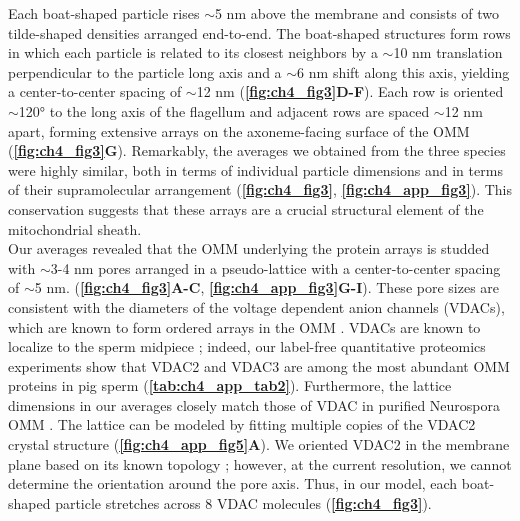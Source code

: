Each boat-shaped particle rises $\sim$5 nm above the membrane and consists of two tilde-shaped densities arranged end-to-end. The boat-shaped structures form rows in which each particle is related to its closest neighbors by a $\sim$10 nm translation perpendicular to the particle long axis and a $\sim$6 nm shift along this axis, yielding a center-to-center spacing of $\sim$12 nm (\textbf{\autoref{fig:ch4_fig3}D-F}). Each row is oriented $\sim$120° to the long axis of the flagellum and adjacent rows are spaced $\sim$12 nm apart, forming extensive arrays on the axoneme-facing surface of the OMM (\textbf{\autoref{fig:ch4_fig3}G}). Remarkably, the averages we obtained from the three species were highly similar, both in terms of individual particle dimensions and in terms of their supramolecular arrangement (\textbf{\autoref{fig:ch4_fig3}}, \textbf{\autoref{fig:ch4_app_fig3}}). This conservation suggests that these arrays are a crucial structural element of the mitochondrial sheath.\\[0.25cm]
\raggedbottom
Our averages revealed that the OMM underlying the protein arrays is studded with $\sim$3-4 nm pores arranged in a pseudo-lattice with a center-to-center spacing of $\sim$5 nm. (\textbf{\autoref{fig:ch4_fig3}A-C}, \textbf{\autoref{fig:ch4_app_fig3}G-I}). These pore sizes are consistent with the diameters of the voltage dependent anion channels (VDACs), which are known to form ordered arrays in the OMM \cite{Guo1993, Hoogenboom2007, Goncalves2007, Mannella1982}. VDACs are known to localize to the sperm midpiece \cite{Kwon2013, Arcelay2008}; indeed, our label-free quantitative proteomics experiments show that VDAC2 and VDAC3 are among the most abundant OMM proteins in pig sperm (\textbf{\autoref{tab:ch4_app_tab2}}). Furthermore, the lattice dimensions in our averages closely match those of VDAC in purified Neurospora OMM \cite{Guo1993, Mannella1998}. The lattice can be modeled by fitting multiple copies of the VDAC2 crystal structure \cite{Schredelseker2014} (\textbf{\autoref{fig:ch4_app_fig5}A}). We oriented VDAC2 in the membrane plane based on its known topology \cite{Tomasello2013, Bayrhuber2008}; however, at the current resolution, we cannot determine the orientation around the pore axis. Thus, in our model, each boat-shaped particle stretches across 8 VDAC molecules (\textbf{\autoref{fig:ch4_fig3}}).

